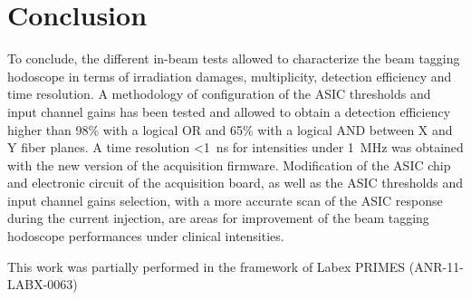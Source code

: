 \documentclass[a4paper,11pt]{article}
\begin{document}
\section{Conclusion}
To conclude, the different in-beam tests allowed to characterize the beam tagging hodoscope in terms of irradiation damages, multiplicity, detection efficiency and time resolution. A methodology of configuration of the ASIC thresholds and input channel gains has been tested and allowed to obtain a detection efficiency higher than 98\% with a logical OR and 65\% with a logical AND between X and Y fiber planes. A time resolution <1~ns for intensities under 1~MHz was obtained with the new version of the acquisition firmware.
Modification of the ASIC chip and electronic circuit of the acquisition board, as well as the ASIC thresholds and input channel gains selection, with a more accurate scan of the ASIC response during the current injection, are areas for improvement of the beam tagging hodoscope performances under clinical intensities.






\acknowledgments
This work was partially performed in the framework of Labex PRIMES (ANR-11-LABX-0063) 
















\end{document}

